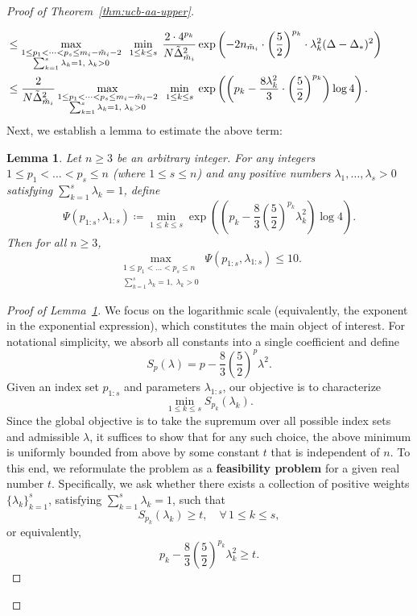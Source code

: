 \documentclass[11pt]{article}
\newtheorem{lemma}{Lemma}
\begin{document}
\begin{proof}[Proof of Theorem~\ref{thm:ucb-aa-upper}]
\begin{itemize}
\begin{itemize}
\begin{align}
    &\!\!\!\!\!\!\!\!\!\!\!\!\!\!\!\!\leq \max_{\substack{1\leq p_1<\cdots <p_{s}\leq m_i-\tilde{m}_i-2\\ \sum _{k=1}^{s}\lambda_k= 1,\; \lambda_k>0}}\;\;\min_{1\leq k\leq s}\;\frac{2\cdot 4^{p_k}}{N\tilde{\Delta}_{\tilde{m}_i}^2}\exp\left(-2n_{\tilde{m}_i}\cdot \left(\frac{5}{2}\right)^{p_k}\cdot \lambda_k^2(\Delta-\Delta_*)^2\right)\notag\\
   & \!\!\!\!\!\!\!\!\!\!\!\!\!\!\!\!\leq \frac{2}{N\tilde{\Delta}_{\tilde{m}_i}^2}\max_{\substack{1\leq p_1<\cdots <p_{s}\leq m_i-\tilde{m}_i-2\\ \sum _{k=1}^{s}\lambda_k= 1,\; \lambda_k>0}}\;\;\min_{1\leq k\leq s}\;\exp\left(\left(p_k-\frac{8\lambda_k^2}{3}\cdot \left(\frac{5}{2}\right)^{p_k}\right)\log 4\right).
    \label{eq: A-3 G-3 b2 optimization newest}
\end{align}
Next, we establish a lemma to estimate the above term:
\begin{lemma}
\label{Lemma 1}    
Let \( n \geq 3 \) be an arbitrary integer. For any integers \( 1 \leq p_1 < \dots < p_s \leq n \) (where \( 1 \leq s \leq n \)) and any positive numbers \( \lambda_1, \dots, \lambda_s > 0 \) satisfying \( \sum_{k=1}^s \lambda_k = 1 \), define
\[
\Psi(p_{1:s}, \lambda_{1:s}) \coloneqq \min_{1 \leq k \leq s} \exp\left( \left( p_k - \frac{8}{3} \left( \frac{5}{2} \right)^{p_k} \lambda_k^2 \right) \log 4 \right).
\]
Then for all \( n \geq 3 \),
\[
\max_{\substack{1 \leq p_1 < \dots < p_s \leq n \\ \sum _{k=1}^{s}\lambda_k= 1,\; \lambda_k>0}} \Psi(p_{1:s}, \lambda_{1:s}) \leq 10.
\]
\end{lemma}
\begin{proof}[Proof of Lemma~\ref{Lemma 1}]
    We focus on the logarithmic scale (equivalently, the exponent in the exponential expression), which constitutes the main object of interest. For notational simplicity, we absorb all constants into a single coefficient and define
\[
S_p(\lambda) = p - \frac{8}{3} \left( \frac{5}{2} \right)^p \lambda^2.
\]
Given an index set \( p_{1:s} \) and parameters \( \lambda_{1:s} \), our objective is to characterize
\[
\min_{1 \leq k \leq s} S_{p_k}(\lambda_k).
\]
Since the global objective is to take the supremum over all possible index sets and admissible $\lambda$, it suffices to show that for any such choice, the above minimum is uniformly bounded from above by some constant $t$ that is independent of $n$. To this end, we reformulate the problem as a \textbf{feasibility problem} for a given real number \( t \). Specifically, we ask whether there exists a collection of positive weights \( \{\lambda_k\}_{k=1}^s \), satisfying \( \sum_{k=1}^s \lambda_k = 1 \), such that
\[
S_{p_k}(\lambda_k) \geq t ,\quad \forall\, 1\leq k\leq s,
\]
or equivalently,
\[
p_k - \frac{8}{3} \left( \frac{5}{2} \right)^{p_k} \lambda_k^2 \geq t.
\]


\end{proof}
\end{itemize}
\end{itemize}
\end{proof}
\end{document}
